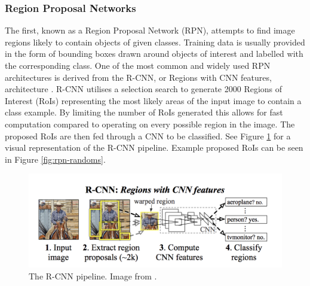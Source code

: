 \subsubsection{Region Proposal Networks}\label{ch:Background,sec:objectDetection,sub:RPN}

The first, known as a Region Proposal Network (RPN), attempts to find image regions likely to contain objects of given classes. Training data is usually provided in the form of bounding boxes drawn around objects of interest and labelled with the corresponding class. One of the most common and widely used RPN architectures is derived from the R-CNN, or Regions with CNN features, architecture \cite{girshick_rich_2014}. R-CNN utilises a selection search \cite{uijlings_selective_2013} to generate 2000 Regions of Interest (RoIs) representing the most likely areas of the input image to contain a class example. By limiting the number of RoIs generated this allows for fast computation compared to operating on every possible region in the image. The proposed RoIs are then fed through a CNN to be classified. See Figure \ref{fig:r-cnn} for a visual representation of the R-CNN pipeline. Example proposed RoIs can be seen in Figure \ref{fig:rpn-randoms}.

\begin{figure}
	\begin{center}
		\includegraphics[scale=0.3]{Chapter2/figs/r-cnn.png}
	\end{center}
	\caption{The R-CNN pipeline. Image from \cite{girshick_rich_2014}.}
	\label{fig:r-cnn}
\end{figure}

